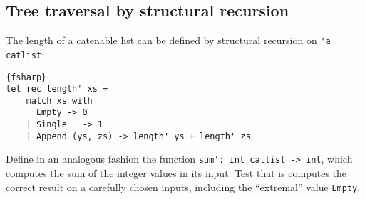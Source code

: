 \subsection*{Tree traversal by structural recursion}

The length of a catenable list can be defined by structural recursion on \verb|'a catlist|:
\begin{lstlisting}{fsharp}
let rec length' xs =
    match xs with
      Empty -> 0
    | Single _ -> 1
    | Append (ys, zs) -> length' ys + length' zs
\end{lstlisting}

Define in an analogous fashion the function \verb|sum': int catlist -> int|, which computes the sum of the integer values in its
input. Test that is computes the correct result on a carefully chosen inputs, including the ``extremal'' value \verb|Empty|.
